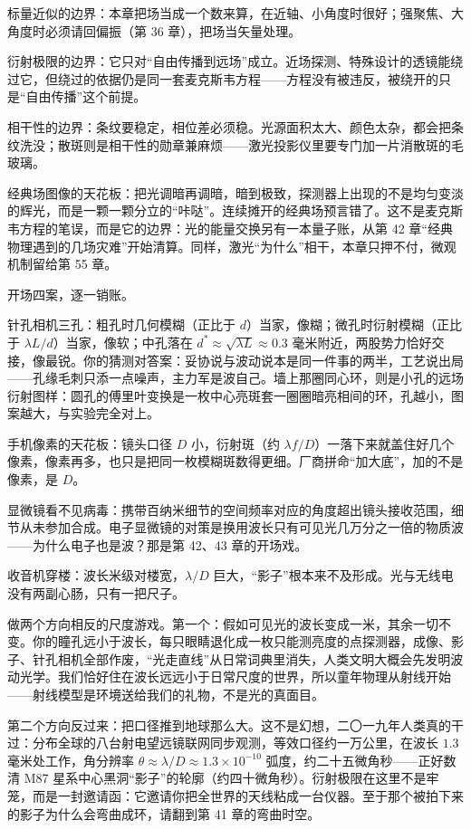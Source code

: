 标量近似的边界：本章把场当成一个数来算，在近轴、小角度时很好；强聚焦、大角度时必须请回偏振（第 36 章），把场当矢量处理。

衍射极限的边界：它只对“自由传播到远场”成立。近场探测、特殊设计的透镜能绕过它，但绕过的依据仍是同一套麦克斯韦方程——方程没有被违反，被绕开的只是“自由传播”这个前提。

相干性的边界：条纹要稳定，相位差必须稳。光源面积太大、颜色太杂，都会把条纹洗没；散斑则是相干性的勋章兼麻烦——激光投影仪里要专门加一片消散斑的毛玻璃。

经典场图像的天花板：把光调暗再调暗，暗到极致，探测器上出现的不是均匀变淡的辉光，而是一颗一颗分立的“咔哒”。连续摊开的经典场预言错了。这不是麦克斯韦方程的笔误，而是它的边界：光的能量交换另有一本量子账，从第 42 章“经典物理遇到的几场灾难”开始清算。同样，激光“为什么”相干，本章只押不付，微观机制留给第 55 章。


开场四案，逐一销账。

针孔相机三孔：粗孔时几何模糊（正比于 \(d\)）当家，像糊；微孔时衍射模糊（正比于 \(\lambda L/d\)）当家，像软；中孔落在 \(d^{*}\approx\sqrt{\lambda L}\approx 0.3\) 毫米附近，两股势力恰好交接，像最锐。你的猜测对答案：妥协说与波动说本是同一件事的两半，工艺说出局——孔缘毛刺只添一点噪声，主力军是波自己。墙上那圈同心环，则是小孔的远场衍射图样：圆孔的傅里叶变换是一枚中心亮斑套一圈圈暗亮相间的环，孔越小，图案越大，与实验完全对上。

手机像素的天花板：镜头口径 \(D\) 小，衍射斑（约 \(\lambda f/D\)）一落下来就盖住好几个像素，像素再多，也只是把同一枚模糊斑数得更细。厂商拼命“加大底”，加的不是像素，是 \(D\)。

显微镜看不见病毒：携带百纳米细节的空间频率对应的角度超出镜头接收范围，细节从未参加合成。电子显微镜的对策是换用波长只有可见光几万分之一倍的物质波——为什么电子也是波？那是第 42、43 章的开场戏。

收音机穿楼：波长米级对楼宽，\(\lambda/D\) 巨大，“影子”根本来不及形成。光与无线电没有两副心肠，只有一把尺子。


\begin{thought}[波长一米的世界与地球那么大的望远镜]
做两个方向相反的尺度游戏。第一个：假如可见光的波长变成一米，其余一切不变。你的瞳孔远小于波长，每只眼睛退化成一枚只能测亮度的点探测器，成像、影子、针孔相机全部作废，“光走直线”从日常词典里消失，人类文明大概会先发明波动光学。我们恰好住在波长远远小于日常尺度的世界，所以童年物理从射线开始——射线模型是环境送给我们的礼物，不是光的真面目。

第二个方向反过来：把口径推到地球那么大。这不是幻想，二〇一九年人类真的干过：分布全球的八台射电望远镜联网同步观测，等效口径约一万公里，在波长 \(1.3\) 毫米处工作，角分辨率 \(\theta\approx\lambda/D\approx1.3\times10^{-10}\) 弧度，约二十五微角秒——正好数清 M87 星系中心黑洞“影子”的轮廓（约四十微角秒）。衍射极限在这里不是牢笼，而是一封邀请函：它邀请你把全世界的天线粘成一台仪器。至于那个被拍下来的影子为什么会弯曲成环，请翻到第 41 章的弯曲时空。
\end{thought}

